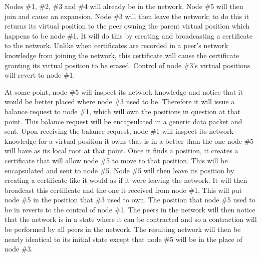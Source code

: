 \documentclass[ %
                    author={Luke Murray},
                supervisor={Dr. Simon Hollis},
                     title={Shadow Peer-to-Peer Networks},
                  subtitle={},
                    degree={MEng},
                      year={2013} ]{thesis}
\begin{document}
Nodes \#1, \#2, \#3 and \#4 will already be in the network. Node \#5 will then join and cause an expansion. Node \#3 will then leave the network; to do this it returns its virtual position to the peer owning the parent virtual position which happens to be node \#1. It will do this by creating and broadcasting a certificate to the network. Unlike when certificates are recorded in a peer's network knowledge from joining the network, this certificate will cause the certificate granting its virtual position to be erased. Control of node \#3's virtual positions will revert to node \#1.

At some point, node \#5 will inspect its network knowledge and notice that it would be better placed where node \#3 used to be. Therefore it will issue a balance request to node \#1, which will own the positions in question at that point. This balance request will be encapsulated in a generic data packet and sent. Upon receiving the balance request, node \#1 will inspect its network knowledge for a virtual position it owns that is in a better than the one node \#5 will have as its local root at that point. Once it finds a position, it creates a certificate that will allow node \#5 to move to that position. This will be encapsulated and sent to node \#5. Node \#5 will then leave its position by creating a certificate like it would as if it were leaving the network. It will then broadcast this certificate and the one it received from node \#1. This will put node \#5 in the position that \#3 used to own. The position that node \#5 used to be in reverts to the control of node \#1. The peers in the network will then notice that the network is in a state where it can be contracted and so a contraction will be performed by all peers in the network. The resulting network will then be nearly identical to its initial state except that node \#5 will be in the place of node \#3.
\end{document}
